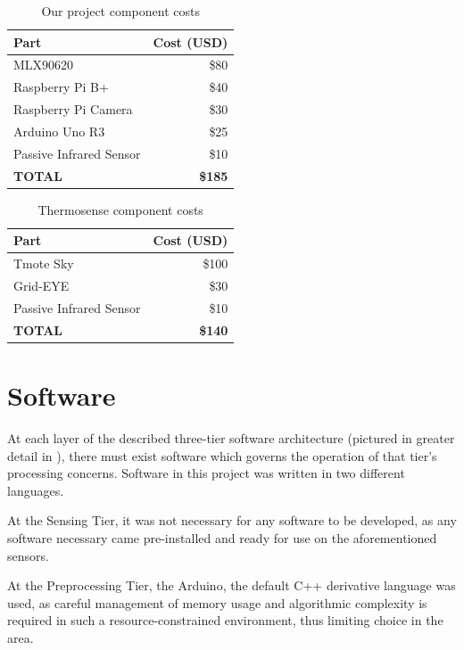 \documentclass[../thesis/thesis.tex]{subfiles}
\begin{document}
\begin{table}
\centering
\begin{tabular}[H]{|l|r|}
\hline
\textbf{Part} & \textbf{Cost (USD)} \\ \hline
MLX90620 & \$80 \\ \hline
Raspberry Pi B+ &  \$40 \\ \hline
Raspberry Pi Camera &  \$30 \\ \hline
Arduino Uno R3 & \$25 \\ \hline
Passive Infrared Sensor & \$10 \\ \hline
\textbf{TOTAL} & \textbf{\$185} \\ \hline
\end{tabular}
\caption{Our project component costs}
\label{tab:sensor:cost}
\end{table}

\begin{table}
\centering
\begin{tabular}[H]{|l|r|}
\hline
\textbf{Part} & \textbf{Cost (USD)} \\ \hline
Tmote Sky & \$100 \\ \hline
Grid-EYE & \$30 \\ \hline
Passive Infrared Sensor & \$10 \\ \hline
\textbf{TOTAL} & \textbf{\$140} \\ \hline
\end{tabular}
\caption{Thermosense component costs}
\label{tab:sensor:thermosensecost}
\end{table}


\section{Software}


At each layer of the described three-tier software architecture (pictured in greater detail in ), there must exist software which governs the operation of that tier's processing concerns. Software in this project was written in two different languages.

At the Sensing Tier, it was not necessary for any software to be developed, as any software necessary came pre-installed and ready for use on the aforementioned sensors.

At the Preprocessing Tier, the Arduino, the default C++ derivative language was used, as careful management of memory usage and algorithmic complexity is required in such a resource-constrained environment, thus limiting choice in the area.
\end{document}
